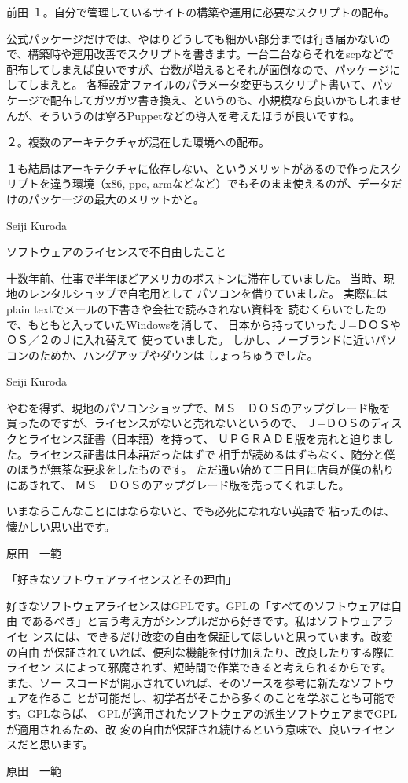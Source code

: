 \documentclass[cjk,dvipdfmx,12pt]{beamer}
\begin{document}
\begin{frame}{前田}
１。自分で管理しているサイトの構築や運用に必要なスクリプトの配布。

公式パッケージだけでは、やはりどうしても細かい部分までは行き届かないので、構築時や運用改善でスクリプトを書きます。一台二台ならそれをscpなどで配布してしまえば良いですが、台数が増えるとそれが面倒なので、パッケージにしてしまえと。
各種設定ファイルのパラメータ変更もスクリプト書いて、パッケージで配布してガツガツ書き換え、というのも、小規模なら良いかもしれませんが、そういうのは寧ろPuppetなどの導入を考えたほうが良いですね。

２。複数のアーキテクチャが混在した環境への配布。

１も結局はアーキテクチャに依存しない、というメリットがあるので作ったスクリプトを違う環境（x86, ppc,
armなどなど）でもそのまま使えるのが、データだけのパッケージの最大のメリットかと。

\end{frame}\begin{frame}{Seiji Kuroda}


ソフトウェアのライセンスで不自由したこと

十数年前、仕事で半年ほどアメリカのボストンに滞在していました。
当時、現地のレンタルショップで自宅用として
パソコンを借りていました。
実際にはplain textでメールの下書きや会社で読みきれない資料を
読むくらいでしたので、もともと入っていたWindowsを消して、
日本から持っていったＪ−ＤＯＳやＯＳ／２のＪに入れ替えて
使っていました。
しかし、ノーブランドに近いパソコンのためか、ハングアップやダウンは
しょっちゅうでした。
\end{frame}\begin{frame}{Seiji Kuroda}

やむを得ず、現地のパソコンショップで、ＭＳ　ＤＯＳのアップグレード版を
買ったのですが、ライセンスがないと売れないというので、
Ｊ−ＤＯＳのディスクとライセンス証書（日本語）を持って、
ＵＰＧＲＡＤＥ版を売れと迫りました。ライセンス証書は日本語だったはずで
相手が読めるはずもなく、随分と僕のほうが無茶な要求をしたものです。
ただ通い始めて三日目に店員が僕の粘りにあきれて、
ＭＳ　ＤＯＳのアップグレード版を売ってくれました。

いまならこんなことにはならないと、でも必死になれない英語で
粘ったのは、懐かしい思い出です。

\end{frame}\begin{frame}{原田　一範}


「好きなソフトウェアライセンスとその理由」

好きなソフトウェアライセンスはGPLです。GPLの「すべてのソフトウェアは自由
であるべき」と言う考え方がシンプルだから好きです。私はソフトウェアライセ
ンスには、できるだけ改変の自由を保証してほしいと思っています。改変の自由
が保証されていれば、便利な機能を付け加えたり、改良したりする際にライセン
スによって邪魔されず、短時間で作業できると考えられるからです。また、ソー
スコードが開示されていれば、そのソースを参考に新たなソフトウェアを作るこ
とが可能だし、初学者がそこから多くのことを学ぶことも可能です。GPLならば、
GPLが適用されたソフトウェアの派生ソフトウェアまでGPLが適用されるため、改
変の自由が保証され続けるという意味で、良いライセンスだと思います。
\end{frame}\begin{frame}{原田　一範}


\end{frame}
\end{document}
